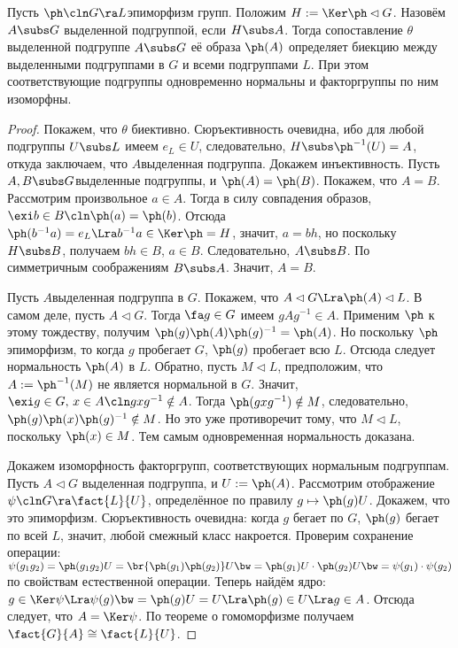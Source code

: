 \documentclass[a4paper]{article}
\newcommand{\kph}{\Ker \ph}
\begin{document}
\begin{theorem}[О соответствии]
Пусть $\ph\cln G \ra L$\т эпиморфизм групп. Положим $H := \kph \lhd G$.  Назовём $A \subs G$ выделенной
подгруппой, если $H \subs A$. Тогда сопоставление $\theta$ выделенной подгруппе $A \subs G$ её образа
$\ph(A)$ определяет биекцию между выделенными подгруппами в $G$ и всеми подгруппами $L$. При этом
соответствующие подгруппы одновременно нормальны и факторгруппы по ним изоморфны.
\end{theorem}
\begin{proof}
 Покажем, что $\theta$ биективно. Сюръективность очевидна, ибо для  любой подгруппы $U \subs L$ имеем
$e_L \in U$, следовательно, $H \subs \ph^{-1}(U) = A$, откуда заключаем, что $A$\т выделенная подгруппа.
Докажем инъективность. Пусть $A, B \subs G$\т выделенные подгруппы, и $\ph(A)=\ph(B)$. Покажем, что $A=B$.
Рассмотрим произвольное $a \in A$. Тогда в силу совпадения образов, $\exi b \in B\cln \ph(a)=\ph(b)$. Отсюда
$\ph(b^{-1}a)=e_L \Lra b^{-1}a \in \kph =H$, значит, $a=bh$, но поскольку $H \subs B$, получаем $bh \in B$,
 $a \in B$. Следовательно, $A \subs B$. По симметричным соображениям $B \subs A$. Значит, $A=B$.

 Пусть $A$\т выделенная подгруппа в $G$. Покажем, что  $A \lhd G \Lra \ph(A) \lhd L$. В самом деле,
пусть $A \lhd G$. Тогда $\fa g \in G$ имеем $gAg^{-1} \in A$. Применим $\ph$ к этому тождеству, получим
$\ph(g)\ph(A)\ph(g)^{-1}=\ph(A)$. Но поскольку $\ph$\т эпиморфизм, то когда $g$ пробегает $G$, $\ph(g)$
пробегает всю $L$. Отсюда следует нормальность $\ph(A)$ в $L$. Обратно, пусть $M \lhd L$, предположим, что
$A := \ph^{-1}(M)$ не является нормальной в $G$. Значит, $\exi g \in G,\, x \in A\cln gxg^{-1} \notin A$. Тогда
$\ph(gxg^{-1}) \notin M$, следовательно, $\ph(g)\ph(x)\ph(g)^{-1} \notin M$. Но это уже противоречит тому,
что $M \lhd L$, поскольку $\ph(x) \in M$. Тем самым одновременная нормальность доказана.

 Докажем изоморфность факторгрупп, соответствующих нормальным  подгруппам. Пусть $A \lhd G$\т
выделенная подгруппа, и $U := \ph(A)$. Рассмотрим отображение $\psi\cln G \ra \fact{L}{U}$, определённое по
правилу $g \mapsto \ph(g)U$. Докажем, что это эпиморфизм. Сюръективность очевидна: когда $g$ бегает по $G$,
$\ph(g)$ бегает по всей $L$, значит, любой смежный класс накроется. Проверим сохранение операции:
$\psi(g_1g_2)=\ph(g_1g_2)U=\br{\ph(g_1)\ph(g_2)} U \bw= \ph(g_1)U \cdot \ph(g_2)U \bw= \psi(g_1) \cdot \psi(g_2)$ по
свойствам естественной операции. Теперь найдём ядро: $g \in \Ker \psi \Lra \psi(g) \bw= \ph(g)U=U \Lra \ph(g)
\in U \Lra g \in A$. Отсюда следует, что $A = \Ker \psi$. По теореме о гомоморфизме получаем $\fact{G}{A}
\cong \fact{L}{U}$.
\end{proof}
\end{document}
